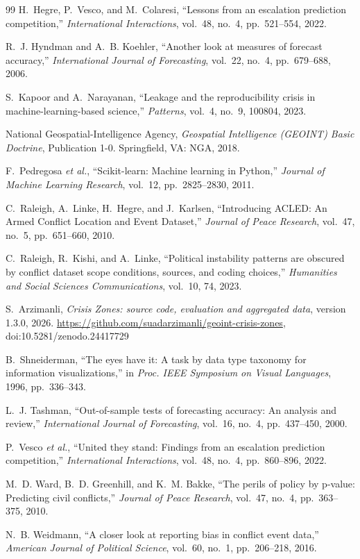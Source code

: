 \documentclass[11pt,a4paper]{article}
\newcommand{\repourl}{https://github.com/suadarzimanli/geoint-crisis-zones}
\begin{document}
\begin{thebibliography}{99}
 H.~Hegre, P.~Vesco, and M.~Colaresi, ``Lessons from an escalation prediction competition,'' \emph{International Interactions}, vol.~48, no.~4, pp.~521--554, 2022.

 R.~J. Hyndman and A.~B. Koehler, ``Another look at measures of forecast accuracy,'' \emph{International Journal of Forecasting}, vol.~22, no.~4, pp.~679--688, 2006.

 S.~Kapoor and A.~Narayanan, ``Leakage and the reproducibility crisis in machine-learning-based science,'' \emph{Patterns}, vol.~4, no.~9, 100804, 2023.

 National Geospatial-Intelligence Agency, \emph{Geospatial Intelligence (GEOINT) Basic Doctrine}, Publication 1-0. Springfield, VA: NGA, 2018.

 F.~Pedregosa \emph{et al.}, ``Scikit-learn: Machine learning in Python,'' \emph{Journal of Machine Learning Research}, vol.~12, pp.~2825--2830, 2011.

 C.~Raleigh, A.~Linke, H.~Hegre, and J.~Karlsen, ``Introducing ACLED: An Armed Conflict Location and Event Dataset,'' \emph{Journal of Peace Research}, vol.~47, no.~5, pp.~651--660, 2010.

 C.~Raleigh, R.~Kishi, and A.~Linke, ``Political instability patterns are obscured by conflict dataset scope conditions, sources, and coding choices,'' \emph{Humanities and Social Sciences Communications}, vol.~10, 74, 2023.

 S.~Arzimanli, \emph{Crisis Zones: source code, evaluation and aggregated data}, version 1.3.0, 2026. \url{\repourl}, doi:10.5281/zenodo.24417729

 B.~Shneiderman, ``The eyes have it: A task by data type taxonomy for information visualizations,'' in \emph{Proc. IEEE Symposium on Visual Languages}, 1996, pp.~336--343.

 L.~J. Tashman, ``Out-of-sample tests of forecasting accuracy: An analysis and review,'' \emph{International Journal of Forecasting}, vol.~16, no.~4, pp.~437--450, 2000.

 P.~Vesco \emph{et al.}, ``United they stand: Findings from an escalation prediction competition,'' \emph{International Interactions}, vol.~48, no.~4, pp.~860--896, 2022.

 M.~D. Ward, B.~D. Greenhill, and K.~M. Bakke, ``The perils of policy by p-value: Predicting civil conflicts,'' \emph{Journal of Peace Research}, vol.~47, no.~4, pp.~363--375, 2010.

 N.~B. Weidmann, ``A closer look at reporting bias in conflict event data,'' \emph{American Journal of Political Science}, vol.~60, no.~1, pp.~206--218, 2016.

\end{thebibliography}
\end{document}
